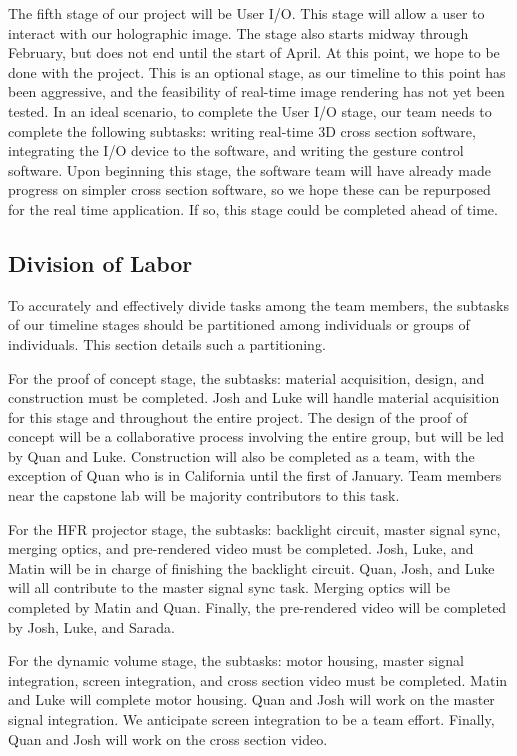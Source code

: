 \documentclass[12pt]{article}
\begin{document}
The fifth stage of our project will be User I/O. This stage will allow a user to interact with our holographic image. The stage also starts midway through February, but does not end until the start of April. At this point, we hope to be done with the project. This is an optional stage, as our timeline to this point has been aggressive, and the feasibility of real-time image rendering has not yet been tested. In an ideal scenario, to complete the User I/O stage, our team needs to complete the following subtasks: writing real-time 3D cross section software, integrating the I/O device to the software, and writing the gesture control software. Upon beginning this stage, the software team will have already made progress on simpler cross section software, so we hope these can be repurposed for the real time application. If so, this stage could be completed ahead of time.

\subsection{Division of Labor}
To accurately and effectively divide tasks among the team members, the subtasks of our timeline stages should be partitioned among individuals or groups of individuals. This section details such a partitioning.

For the proof of concept stage, the subtasks: material acquisition, design, and construction must be completed. Josh and Luke will handle material acquisition for this stage and throughout the entire project. The design of the proof of concept will be a collaborative process involving the entire group, but will be led by Quan and Luke. Construction will also be completed as a team, with the exception of Quan who is in California until the first of January. Team members near the capstone lab will be majority contributors to this task.

For the HFR projector stage, the subtasks: backlight circuit, master signal sync, merging optics, and pre-rendered video must be completed. Josh, Luke, and Matin will be in charge of finishing the backlight circuit. Quan, Josh, and Luke will all contribute to the master signal sync task. Merging optics will be completed by Matin and Quan. Finally, the pre-rendered video will be completed by Josh, Luke, and Sarada.

For the dynamic volume stage, the subtasks: motor housing, master signal integration, screen integration, and cross section video must be completed. Matin and Luke will complete motor housing. Quan and Josh will work on the master signal integration. We anticipate screen integration to be a team effort. Finally, Quan and Josh will work on the cross section video.
\end{document}
